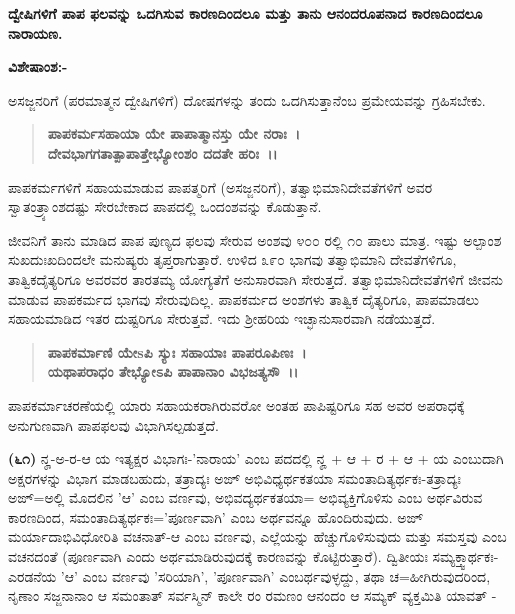 \begin{center}
\textbf{ ದ್ವೇಷಿಗಳಿಗೆ ಪಾಪ ಫಲವನ್ನು ಒದಗಿಸುವ ಕಾರಣದಿಂದಲೂ ಮತ್ತು ತಾನು ಆನಂದರೂಪನಾದ ಕಾರಣದಿಂದಲೂ ನಾರಾಯಣ.}
\end{center}

\noindent
\textbf{ವಿಶೇಷಾಂಶ:-}

ಅಸಜ್ಜನರಿಗೆ (ಪರಮಾತ್ಮನ ದ್ವೇಷಿಗಳಿಗೆ) ದೋಷಗಳನ್ನು ತಂದು ಒದಗಿಸುತ್ತಾನೆಂಬ ಪ್ರಮೇಯವನ್ನು ಗ್ರಹಿಸಬೇಕು.

\begin{verse}
\textbf{ಪಾಪಕರ್ಮಸಹಾಯಾ ಯೇ ಪಾಪಾತ್ಮಾನಸ್ತು ಯೇ ನರಾಃ~।}\\\textbf{ದೇವಭಾಗಗತಾತ್ಪಾಪಾತ್ತೇಭ್ಯೋಂಶಂ ದದತೇ ಹರಿಃ~।।}
\end{verse}


ಪಾಪಕರ್ಮಗಳಿಗೆ ಸಹಾಯಮಾಡುವ ಪಾಪತ್ಮರಿಗೆ (ಅಸಜ್ಜನರಿಗೆ), ತತ್ವಾಭಿಮಾನಿದೇವತೆಗಳಿಗೆ ಅವರ ಸ್ವಾತಂತ್ರ್ಯಾಂಶದಷ್ಟು ಸೇರಬೇಕಾದ ಪಾಪದಲ್ಲಿ ಒಂದಂಶವನ್ನು ಕೊಡುತ್ತಾನೆ.

ಜೀವನಿಗೆ ತಾನು ಮಾಡಿದ ಪಾಪ ಪುಣ್ಯದ ಫಲವು ಸೇರುವ ಅಂಶವು ೪೦೦ ರಲ್ಲಿ ೧೦ ಪಾಲು ಮಾತ್ರ. ಇಷ್ಟು ಅಲ್ಪಾಂಶ ಸುಖದುಃಖದಿಂದಲೇ ಮನುಷ್ಯರು ತೃಪ್ತರಾಗುತ್ತಾರೆ. ಉಳಿದ ೩೯೦ ಭಾಗವು ತತ್ವಾಭಿಮಾನಿ ದೇವತೆಗಳಿಗೂ, ತಾತ್ವಿಕದೈತ್ಯರಿಗೂ ಅವರವರ ತಾರತಮ್ಯ ಯೋಗ್ಯತೆಗೆ ಅನುಸಾರವಾಗಿ ಸೇರುತ್ತದೆ. ತತ್ವಾಭಿಮಾನಿದೇವತೆಗಳಿಗೆ ಜೀವನು ಮಾಡುವ ಪಾಪಕರ್ಮದ ಭಾಗವು ಸೇರುವುದಿಲ್ಲ. ಪಾಪಕರ್ಮದ ಅಂಶಗಳು ತಾತ್ವಿಕ ದೈತ್ಯರಿಗೂ, ಪಾಪಮಾಡಲು ಸಹಾಯಮಾಡಿದ ಇತರ ದುಷ್ಟರಿಗೂ ಸೇರುತ್ತವೆ. ಇದು ಶ‍್ರೀಹರಿಯ ಇಚ್ಛಾನುಸಾರವಾಗಿ ನಡೆಯುತ್ತದೆ.

\begin{verse}
\textbf{ಪಾಪಕರ್ಮಾಣಿ ಯೇsಪಿ ಸ್ಯುಃ ಸಹಾಯಾಃ ಪಾಪರೂಪಿಣಃ~।}\\\textbf{ಯಥಾಪರಾಧಂ ತೇಭ್ಯೋಽಪಿ ಪಾಪಾನಾಂ ವಿಭಜತ್ಯಸೌ~।।}
\end{verse}


ಪಾಪಕರ್ಮಾಚರಣೆಯಲ್ಲಿ ಯಾರು ಸಹಾಯಕರಾಗಿರುವರೋ ಅಂತಹ ಪಾಪಿಷ್ಟರಿಗೂ ಸಹ ಅವರ ಅಪರಾಧಕ್ಕೆ ಅನುಗುಣವಾಗಿ ಪಾಪಫಲವು ವಿಭಾಗಿಸಲ್ಪಡುತ್ತದೆ.

\textbf{(೬೧)} ನೄ-ಅ-ರ-ಆ ಯ ಇತ್ಯಕ್ಷರ ವಿಭಾಗಃ-'ನಾರಾಯ' ಎಂಬ ಪದದಲ್ಲಿ ನೄ + ಆ + ರ + ಆ + ಯ ಎಂಬುದಾಗಿ ಅಕ್ಷರಗಳನ್ನು ವಿಭಾಗ ಮಾಡಬಹುದು, ತತ್ರಾದ್ಯಃ ಅಙ್ ಅಭಿವಿಧ್ಯರ್ಥಕತಯಾ ಸಮಂತಾದಿತ್ಯರ್ಥಕಃ-ತತ್ರಾದ್ಯಃ ಅಙ್=ಅಲ್ಲಿ ಮೊದಲಿನ 'ಆ' ಎಂಬ ವರ್ಣವು, ಅಭಿವದ್ಯರ್ಥಕತಯಾ= ಅಭಿವ್ಯಕ್ತಿಗೊಳಿಸು ಎಂಬ ಅರ್ಥವಿರುವ ಕಾರಣದಿಂದ, ಸಮಂತಾದಿತ್ಯರ್ಥಕಃ='ಪೂರ್ಣವಾಗಿ' ಎಂಬ ಅರ್ಥವನ್ನೂ ಹೊಂದಿರುವುದು. ಅಙ್ ಮರ್ಯಾದಾಭಿವಿಧೋರಿತಿ ವಚನಾತ್-ಆ ಎಂಬ ವರ್ಣವು, ಎಲ್ಲೆಯನ್ನು ಹೆಚ್ಚುಗೊಳಿಸುವುದು ಮತ್ತು ಸಮಸ್ತವು ಎಂಬ ವಚನದಂತೆ (ಪೂರ್ಣವಾಗಿ ಎಂದು ಅರ್ಥಮಾಡಿರುವುದಕ್ಕೆ ಕಾರಣವನ್ನು ಕೊಟ್ಟಿರುತ್ತಾರೆ). ದ್ವಿತೀಯಃ ಸಮ್ಯಕ್ತ್ವಾರ್ಥಕಃ-ಎರಡನೆಯ 'ಆ' ಎಂಬ ವರ್ಣವು 'ಸರಿಯಾಗಿ', 'ಪೂರ್ಣವಾಗಿ' ಎಂಬರ್ಥವುಳ್ಳದ್ದು, ತಥಾ ಚ=ಹೀಗಿರುವುದರಿಂದ, ನೃಣಾಂ ಸಜ್ಜನಾನಾಂ ಆ ಸಮಂತಾತ್ ಸರ್ವಸ್ಮಿನ್ ಕಾಲೇ ರಂ ರಮಣಂ ಆನಂದಂ ಆ ಸಮ್ಯಕ್ ವ್ಯಕ್ತಮಿತಿ ಯಾವತ್ - 

